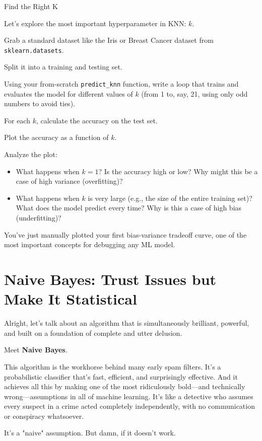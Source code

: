 \documentclass[11pt, letterpaper, openany]{book}
\begin{document}
\begin{challengebox}
Find the Right K

Let's explore the most important hyperparameter in KNN: $k$.

Grab a standard dataset like the Iris or Breast Cancer dataset from \texttt{sklearn.datasets}.

Split it into a training and testing set.

Using your from-scratch \texttt{predict\_knn} function, write a loop that trains and evaluates the model for different values of $k$ (from 1 to, say, 21, using only odd numbers to avoid ties).

For each $k$, calculate the accuracy on the test set.

Plot the accuracy as a function of $k$.

Analyze the plot:
\begin{itemize}
    \item What happens when $k=1$? Is the accuracy high or low? Why might this be a case of high variance (overfitting)?
    \item What happens when $k$ is very large (e.g., the size of the entire training set)? What does the model predict every time? Why is this a case of high bias (underfitting)?
\end{itemize}
You've just manually plotted your first bias-variance tradeoff curve, one of the most important concepts for debugging any ML model.
\end{challengebox}

\chapter{Naive Bayes: Trust Issues but Make It Statistical}

Alright, let's talk about an algorithm that is simultaneously brilliant, powerful, and built on a foundation of complete and utter delusion.

Meet \textbf{Naive Bayes}.

This algorithm is the workhorse behind many early spam filters. It's a probabilistic classifier that's fast, efficient, and surprisingly effective. And it achieves all this by making one of the most ridiculously bold—and technically wrong—assumptions in all of machine learning. It's like a detective who assumes every suspect in a crime acted completely independently, with no communication or conspiracy whatsoever.

It's a "naive" assumption. But damn, if it doesn't work.
\end{document}
